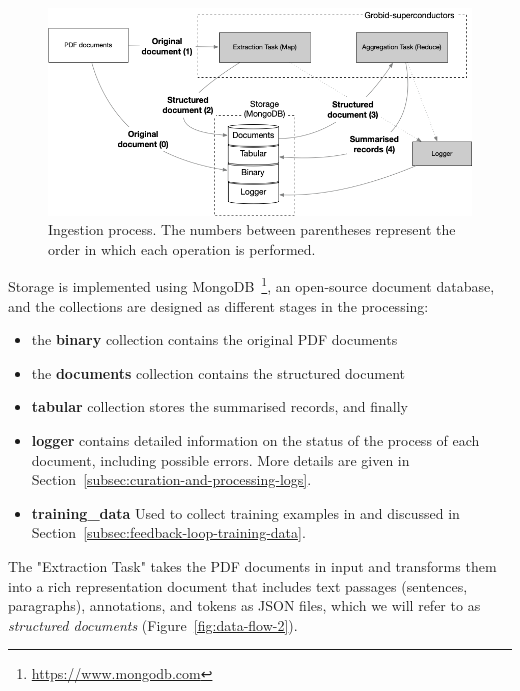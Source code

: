 \begin{figure}[htbp]
  \centering
  \includegraphics[width=\textwidth]{figures/curation/ingestion-schema.png} 
  \caption{Ingestion process. The numbers between parentheses represent the order in which each operation is performed. }
  \label{fig:map-reduce}
\end{figure}

Storage is implemented using MongoDB~\footnote{\url{https://www.mongodb.com}}, an open-source document database, and the collections are designed as different stages in the processing: 
\begin{itemize}
    \item the \textbf{binary} collection contains the original PDF documents 
    \item the \textbf{documents} collection contains the structured document
    \item \textbf{tabular} collection stores the summarised records, and finally 
    \item \textbf{logger} contains detailed information on the status of the process of each document, including possible errors. More details are given in Section~\ref{subsec:curation-and-processing-logs}.
    \item \textbf{training\_data} Used to collect training examples in and discussed in Section~\ref{subsec:feedback-loop-training-data}.
\end{itemize}


The "Extraction Task" takes the PDF documents in input and transforms them into a rich representation document that includes text passages (sentences, paragraphs), annotations, and tokens as JSON files, which we will refer to as \textit{structured documents} (Figure~\ref{fig:data-flow-2}). 

